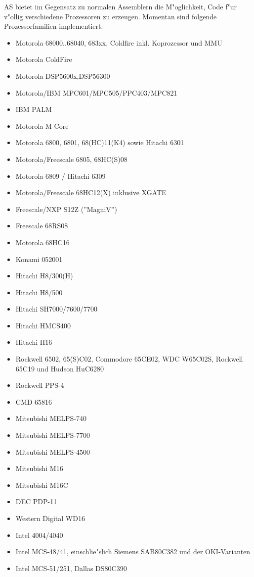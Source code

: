 \documentclass[12pt,a4paper,twoside]{report}
\begin{document}
AS bietet im Gegensatz zu normalen Assemblern die M"oglichkeit, Code
f"ur v"ollig verschiedene Prozessoren zu erzeugen.  Momentan sind
folgende Prozessorfamilien implementiert:
\begin{itemize}
\item{Motorola 68000..68040, 683xx, Coldfire inkl. Koprozessor und MMU}
\item{Motorola ColdFire}
\item{Motorola DSP5600x,DSP56300}
\item{Motorola/IBM MPC601/MPC505/PPC403/MPC821}
\item{IBM PALM}
\item{Motorola M-Core}
\item{Motorola 6800, 6801, 68(HC)11(K4) sowie Hitachi 6301}
\item{Motorola/Freescale 6805, 68HC(S)08}
\item{Motorola 6809 / Hitachi 6309}
\item{Motorola/Freescale 68HC12(X) inklusive XGATE}
\item{Freescale/NXP S12Z (''MagniV'')}
\item{Freescale 68RS08}
\item{Motorola 68HC16}
\item{Konami 052001}
\item{Hitachi H8/300(H)}
\item{Hitachi H8/500}
\item{Hitachi SH7000/7600/7700}
\item{Hitachi HMCS400}
\item{Hitachi H16}
\item{Rockwell 6502, 65(S)C02, Commodore 65CE02, WDC W65C02S, Rockwell 65C19 und
      Hudson HuC6280}
\item{Rockwell PPS-4}
\item{CMD 65816}
\item{Mitsubishi MELPS-740}
\item{Mitsubishi MELPS-7700}
\item{Mitsubishi MELPS-4500}
\item{Mitsubishi M16}
\item{Mitsubishi M16C}
\item{DEC PDP-11}
\item{Western Digital WD16}
\item{Intel 4004/4040}
\item{Intel MCS-48/41, einschlie"slich Siemens SAB80C382 und der
      OKI-Varianten}
\item{Intel MCS-51/251, Dallas DS80C390}

\end{itemize}
\end{document}

